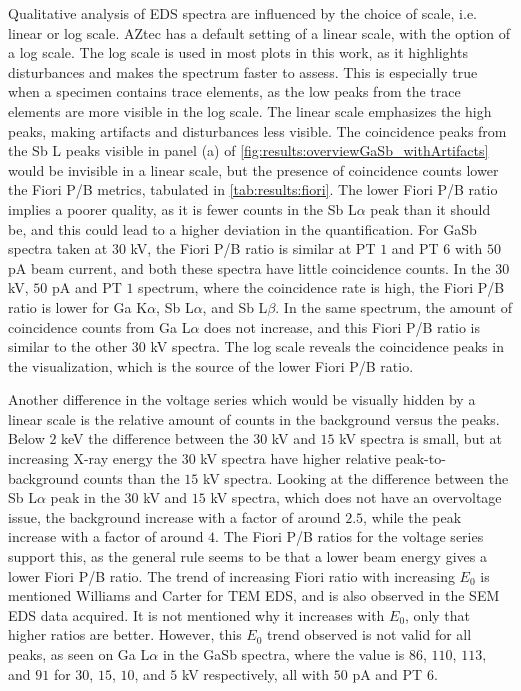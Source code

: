 Qualitative analysis of EDS spectra are influenced by the choice of scale, i.e. linear or log scale.
AZtec has a default setting of a linear scale, with the option of a log scale.
The log scale is used in most plots in this work, as it highlights disturbances and makes the spectrum faster to assess.
This is especially true when a specimen contains trace elements, as the low peaks from the trace elements are more visible in the log scale.
The linear scale emphasizes the high peaks, making artifacts and disturbances less visible.
The coincidence peaks from the Sb L peaks visible in panel (a) of \cref{fig:results:overviewGaSb_withArtifacts} would be invisible in a linear scale, but the presence of coincidence counts lower the Fiori P/B metrics, tabulated in \cref{tab:results:fiori}.
The lower Fiori P/B ratio implies a poorer quality, as it is fewer counts in the Sb L$\alpha$ peak than it should be, and this could lead to a higher deviation in the quantification.
For GaSb spectra taken at $30$ kV, the Fiori P/B ratio is similar at PT $1$ and PT $6$ with $50$ pA beam current, and both these spectra have little coincidence counts.
In the $30$ kV, $50$ pA and PT $1$ spectrum, where the coincidence rate is high, the Fiori P/B ratio is lower for Ga K$\alpha$, Sb L$\alpha$, and Sb L$\beta$.
In the same spectrum, the amount of coincidence counts from Ga L$\alpha$ does not increase, and this Fiori P/B ratio is similar to the other $30$ kV spectra.
The log scale reveals the coincidence peaks in the visualization, which is the source of the lower Fiori P/B ratio.


Another difference in the voltage series which would be visually hidden by a linear scale is the relative amount of counts in the background versus the peaks.
Below $2$ keV the difference between the $30$ kV and $15$ kV spectra is small, but at increasing X-ray energy the $30$ kV spectra have higher relative peak-to-background counts than the $15$ kV spectra.
Looking at the difference between the Sb L$\alpha$ peak in the $30$ kV and $15$ kV spectra, which does not have an overvoltage issue, the background increase with a factor of around $2.5$, while the peak increase with a factor of around $4$.
The Fiori P/B ratios for the voltage series support this, as the general rule seems to be that a lower beam energy gives a lower Fiori P/B ratio.
The trend of increasing Fiori ratio with increasing $E_0$ is mentioned Williams and Carter \cite[p. 614]{williams_carter_tem_2009} for TEM EDS, and is also observed in the SEM EDS data acquired.
It is not mentioned why it increases with $E_0$, only that higher ratios are better.
However, this $E_0$ trend observed is not valid for all peaks, as seen on Ga L$\alpha$ in the GaSb spectra, where the value is $86$, $110$, $113$, and $91$ for $30$, $15$, $10$, and $5$ kV respectively, all with $50$ pA and PT $6$.


